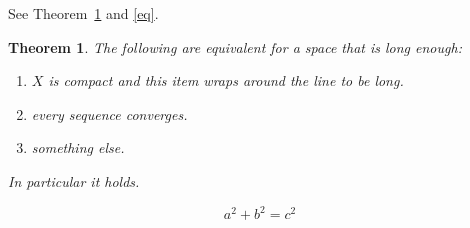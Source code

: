 \documentclass[twocolumn]{article}
\newtheorem{theorem}{Theorem}
\begin{document}
See Theorem~\ref{thm} and \eqref{eq}.
\lipsum[1]
\begin{theorem}\label{thm}
The following are equivalent for a space that is long enough:
\begin{enumerate}
\item $X$ is compact and this item wraps around the line to be long.
\item every sequence converges.
\item something else.
\end{enumerate}
In particular it holds.
\end{theorem}
\lipsum[2]
\begin{equation}\label{eq} a^2 + b^2 = c^2 \end{equation}
\lipsum[3]
\end{document}
